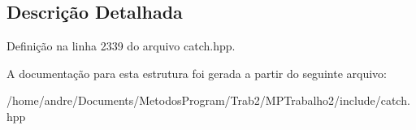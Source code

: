 \subsection{Descrição Detalhada}


Definição na linha 2339 do arquivo catch.\+hpp.



A documentação para esta estrutura foi gerada a partir do seguinte arquivo\+:\begin{DoxyCompactItemize}
\item 
/home/andre/\+Documents/\+Metodos\+Program/\+Trab2/\+M\+P\+Trabalho2/include/catch.\+hpp\end{DoxyCompactItemize}
